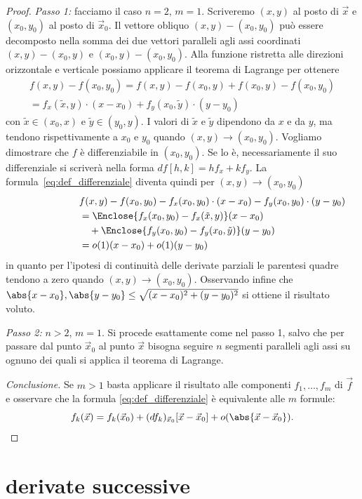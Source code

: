\begin{proof}
\emph{Passo 1:} facciamo il caso $n=2$, $m=1$.
Scriveremo $(x,y)$ al posto di $\vec x$ 
e $(x_0,y_0)$ al posto di $\vec x_0$.
Il vettore obliquo $(x,y)-(x_0,y_0)$ 
può essere decomposto nella somma dei 
due vettori paralleli agli assi coordinati
$(x,y)-(x_0,y)$ e $(x_0,y)-(x_0,y_0)$.
Alla funzione ristretta 
alle direzioni orizzontale e verticale possiamo
applicare il teorema di Lagrange per ottenere
\begin{align*}
  f(x,y) - f(x_0,y_0)
  = f(x,y) - f(x_0,y) + f(x_0,y) - f(x_0,y_0) \\
  = f_x(\tilde x,y)\cdot (x-x_0)
    + f_y(x_0,\tilde y)\cdot (y-y_0)
\end{align*}
con $\tilde x \in (x_0,x)$ e $\tilde y\in(y_0,y)$.
I valori di $\tilde x$ e $\tilde y$ dipendono 
da $x$ e da $y$, ma tendono rispettivamente 
a $x_0$ e $y_0$ quando $(x,y)\to (x_0,y_0)$.
Vogliamo dimostrare che $f$ è differenziabile in $(x_0,y_0)$.
Se lo è, necessariamente il suo differenziale
si scriverà nella forma $df[h,k] = h f_x + k f_y$.
La formula~\eqref{eq:def_differenziale}
diventa quindi per $(x,y)\to(x_0,y_0)$
\begin{align*}
  \lefteqn{f(x,y) - f(x_0,y_0) 
  - f_x(x_0,y_0)\cdot (x-x_0) - f_y(x_0,y_0)\cdot (y-y_0)}\\
  &= \Enclose{f_x(x_0,y_0) - f_x(\tilde x, y)}(x-x_0)\\
  & \quad + \Enclose{f_y(x_0,y_0) - f_y(x_0,\tilde y)}(y-y_0)\\
  & = o(1) (x-x_0) + o(1) (y-y_0)
\end{align*}
in quanto per l'ipotesi di continuità delle derivate parziali
le parentesi quadre tendono a zero quando $(x,y)\to (x_0,y_0)$.
Osservando infine che 
$\abs{x-x_0}, \abs{y-y_0}\le \sqrt{(x-x_0)^2 + (y-y_0)^2}$
si ottiene il risultato voluto.

\emph{Passo 2:} $n>2$, $m=1$.
Si procede esattamente come nel passo 1, salvo che per 
passare dal punto $\vec x_0$ al punto $\vec x$ bisogna 
seguire $n$ segmenti paralleli agli assi su ognuno 
dei quali si applica il teorema di Lagrange.

\emph{Conclusione.} Se $m>1$ basta applicare il risultato 
alle componenti $f_1,\dots, f_m$ di $\vec f$ e osservare 
che la formula \eqref{eq:def_differenziale} è equivalente 
alle $m$ formule:
\[
  f_k(\vec x) = f_k(\vec x_0) + (d f_k)_{\vec x_0}[\vec x-\vec x_0] + o(\abs{\vec x-\vec x_0}).
\]
\end{proof}

\section{derivate successive}

